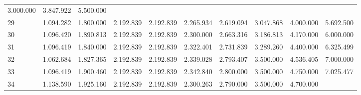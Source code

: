 \begin{tabular}{llllllllll}
  \multicolumn{1}{r}{3.000.000} &
  \multicolumn{1}{r}{3.847.922} &
  \multicolumn{1}{r}{5.500.000} \\
\multicolumn{1}{l}{\hspace{1em}29} &
  \multicolumn{1}{|r}{1.094.282} &
  \multicolumn{1}{r}{1.800.000} &
  \multicolumn{1}{r}{2.192.839} &
  \multicolumn{1}{r}{2.192.839} &
  \multicolumn{1}{r}{2.265.934} &
  \multicolumn{1}{r}{2.619.094} &
  \multicolumn{1}{r}{3.047.868} &
  \multicolumn{1}{r}{4.000.000} &
  \multicolumn{1}{r}{5.692.500} \\
\multicolumn{1}{l}{\hspace{1em}30} &
  \multicolumn{1}{|r}{1.096.420} &
  \multicolumn{1}{r}{1.890.813} &
  \multicolumn{1}{r}{2.192.839} &
  \multicolumn{1}{r}{2.192.839} &
  \multicolumn{1}{r}{2.300.000} &
  \multicolumn{1}{r}{2.663.316} &
  \multicolumn{1}{r}{3.186.813} &
  \multicolumn{1}{r}{4.170.000} &
  \multicolumn{1}{r}{6.000.000} \\
\multicolumn{1}{l}{\hspace{1em}31} &
  \multicolumn{1}{|r}{1.096.419} &
  \multicolumn{1}{r}{1.840.000} &
  \multicolumn{1}{r}{2.192.839} &
  \multicolumn{1}{r}{2.192.839} &
  \multicolumn{1}{r}{2.322.401} &
  \multicolumn{1}{r}{2.731.839} &
  \multicolumn{1}{r}{3.289.260} &
  \multicolumn{1}{r}{4.400.000} &
  \multicolumn{1}{r}{6.325.499} \\
\multicolumn{1}{l}{\hspace{1em}32} &
  \multicolumn{1}{|r}{1.062.684} &
  \multicolumn{1}{r}{1.827.365} &
  \multicolumn{1}{r}{2.192.839} &
  \multicolumn{1}{r}{2.192.839} &
  \multicolumn{1}{r}{2.339.028} &
  \multicolumn{1}{r}{2.793.407} &
  \multicolumn{1}{r}{3.500.000} &
  \multicolumn{1}{r}{4.536.405} &
  \multicolumn{1}{r}{7.000.000} \\
\multicolumn{1}{l}{\hspace{1em}33} &
  \multicolumn{1}{|r}{1.096.419} &
  \multicolumn{1}{r}{1.900.460} &
  \multicolumn{1}{r}{2.192.839} &
  \multicolumn{1}{r}{2.192.839} &
  \multicolumn{1}{r}{2.342.840} &
  \multicolumn{1}{r}{2.800.000} &
  \multicolumn{1}{r}{3.500.000} &
  \multicolumn{1}{r}{4.750.000} &
  \multicolumn{1}{r}{7.025.477} \\
\multicolumn{1}{l}{\hspace{1em}34} &
  \multicolumn{1}{|r}{1.138.590} &
  \multicolumn{1}{r}{1.925.160} &
  \multicolumn{1}{r}{2.192.839} &
  \multicolumn{1}{r}{2.192.839} &
  \multicolumn{1}{r}{2.300.263} &
  \multicolumn{1}{r}{2.790.000} &
  \multicolumn{1}{r}{3.500.000} &
  \multicolumn{1}{r}{4.700.000} &

\end{tabular}
